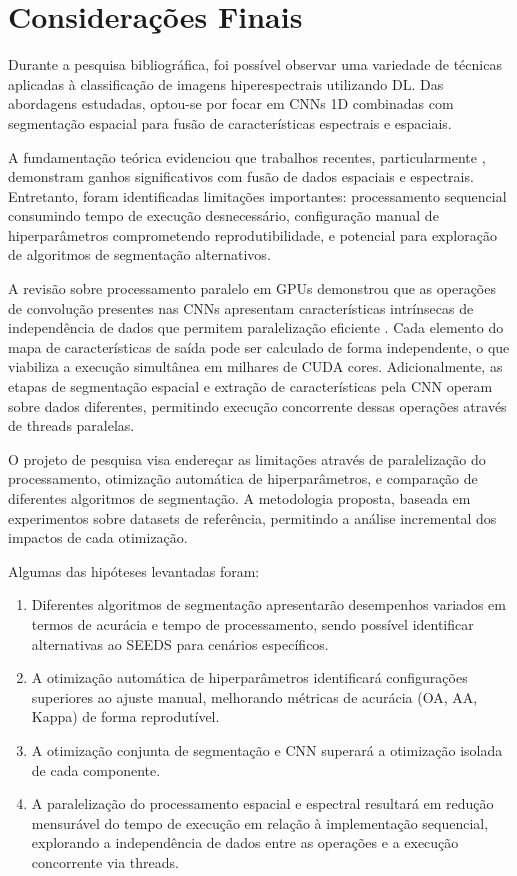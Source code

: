 \chapter{Considerações Finais}
\label{cap:consid}

Durante a pesquisa bibliográfica, foi possível observar uma variedade de técnicas aplicadas à classificação de imagens hiperespectrais utilizando DL. Das abordagens estudadas, optou-se por focar em CNNs 1D combinadas com segmentação espacial para fusão de características espectrais e espaciais.

A fundamentação teórica evidenciou que trabalhos recentes, particularmente \cite{Souza2023}, demonstram ganhos significativos com fusão de dados espaciais e espectrais. Entretanto, foram identificadas limitações importantes: processamento sequencial consumindo tempo de execução desnecessário, configuração manual de hiperparâmetros comprometendo reprodutibilidade, e potencial para exploração de algoritmos de segmentação alternativos.

A revisão sobre processamento paralelo em GPUs demonstrou que as operações de convolução presentes nas CNNs apresentam características intrínsecas de independência de dados que permitem paralelização eficiente \cite{Jorda_cuDNN, cuConv}. Cada elemento do mapa de características de saída pode ser calculado de forma independente, o que viabiliza a execução simultânea em milhares de CUDA cores. Adicionalmente, as etapas de segmentação espacial e extração de características pela CNN operam sobre dados diferentes, permitindo execução concorrente dessas operações através de threads paralelas.

O projeto de pesquisa visa endereçar as limitações através de paralelização do processamento, otimização automática de hiperparâmetros, e comparação de diferentes algoritmos de segmentação. A metodologia proposta, baseada em experimentos sobre datasets de referência, permitindo a análise incremental dos impactos de cada otimização.

Algumas das hipóteses levantadas foram:

\begin{enumerate}
    \item Diferentes algoritmos de segmentação apresentarão desempenhos variados em termos de acurácia e tempo de processamento, sendo possível identificar alternativas ao SEEDS para cenários específicos.
    
    \item A otimização automática de hiperparâmetros identificará configurações superiores ao ajuste manual, melhorando métricas de acurácia (OA, AA, Kappa) de forma reprodutível.
    
    \item A otimização conjunta de segmentação e CNN superará a otimização isolada de cada componente.
    
    \item A paralelização do processamento espacial e espectral resultará em redução mensurável do tempo de execução em relação à implementação sequencial, explorando a independência de dados entre as operações e a execução concorrente via threads.
\end{enumerate}

